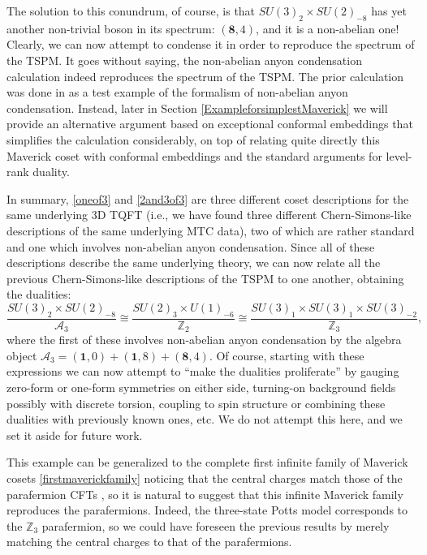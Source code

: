 \documentclass[11pt]{article}
\numberwithin{equation}{section}
\begin{document}
The solution to this conundrum, of course, is that $SU(3)_{2} \times SU(2)_{-8}$ has yet another non-trivial boson in its spectrum: $(\mathbf{8},4)$, and it is a non-abelian one! Clearly, we can now attempt to condense it in order to reproduce the spectrum of the TSPM. It goes without saying, the non-abelian anyon condensation calculation indeed reproduces the spectrum of the TSPM. The prior calculation was done in \cite{Bais:2008ni} as a test example of the formalism of non-abelian anyon condensation. Instead, later in Section \ref{ExampleforsimplestMaverick} we will provide an alternative argument based on exceptional conformal embeddings that simplifies the calculation considerably, on top of relating quite directly this Maverick coset with conformal embeddings and the standard arguments for level-rank duality.

In summary, \eqref{oneof3} and \eqref{2and3of3} are three different coset descriptions for the same underlying 3D TQFT (i.e., we have found three different Chern-Simons-like descriptions of the same underlying MTC data), two of which are rather standard and one which involves non-abelian anyon condensation. Since all of these descriptions describe the same underlying theory, we can now relate all the previous Chern-Simons-like descriptions of the TSPM to one another, obtaining the dualities:
\begin{equation} \label{TSPMDuality}
    \frac{SU(3)_{2} \times SU(2)_{-8}}{\mathcal{A}_{3}} \cong \frac{SU(2)_{3} \times U(1)_{-6}}{\mathbb{Z}_{2}} \cong \frac{SU(3)_{1} \times SU(3)_{1} \times SU(3)_{-2}}{\mathbb{Z}_{3}},
\end{equation}
where the first of these involves non-abelian anyon condensation by the algebra object $\mathcal{A}_{3} = (\mathbf{1},0) + (\mathbf{1},8) + (\mathbf{8},4)$. Of course, starting with these expressions we can now attempt to ``make the dualities proliferate'' by gauging zero-form or one-form symmetries on either side, turning-on background fields possibly with discrete torsion, coupling to spin structure or combining these dualities with previously known ones, etc. We do not attempt this here, and we set it aside for future work.

This example can be generalized to the complete first infinite family of Maverick cosets \eqref{firstmaverickfamily} noticing that the central charges match those of the parafermion CFTs \cite{Fateev:1985mm,DiFrancesco:1997nk}, so it is natural to suggest that this infinite Maverick family reproduces the parafermions. Indeed, the three-state Potts model corresponds to the $\mathbb{Z}_{3}$ parafermion, so we could have foreseen the previous results by merely matching the central charges to that of the parafermions.
\end{document}
